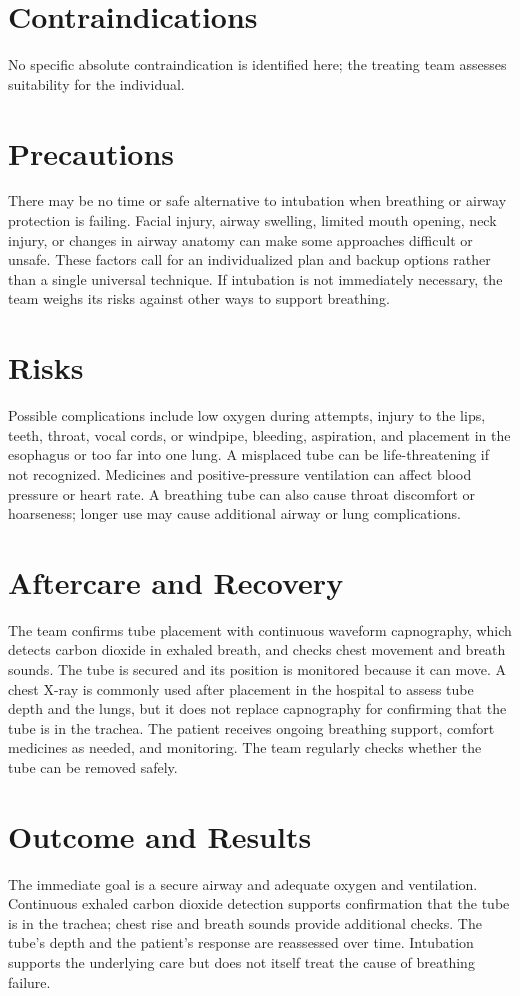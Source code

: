 \section*{Contraindications}
No specific absolute contraindication is identified here; the treating team assesses suitability for the individual.

\section*{Precautions}
There may be no time or safe alternative to intubation when breathing or airway protection is failing. Facial injury, airway swelling, limited mouth opening, neck injury, or changes in airway anatomy can make some approaches difficult or unsafe. These factors call for an individualized plan and backup options rather than a single universal technique. If intubation is not immediately necessary, the team weighs its risks against other ways to support breathing.

\section*{Risks}
Possible complications include low oxygen during attempts, injury to the lips, teeth, throat, vocal cords, or windpipe, bleeding, aspiration, and placement in the esophagus or too far into one lung. A misplaced tube can be life-threatening if not recognized. Medicines and positive-pressure ventilation can affect blood pressure or heart rate. A breathing tube can also cause throat discomfort or hoarseness; longer use may cause additional airway or lung complications.

\section*{Aftercare and Recovery}
The team confirms tube placement with continuous waveform capnography, which detects carbon dioxide in exhaled breath, and checks chest movement and breath sounds. The tube is secured and its position is monitored because it can move. A chest X-ray is commonly used after placement in the hospital to assess tube depth and the lungs, but it does not replace capnography for confirming that the tube is in the trachea. The patient receives ongoing breathing support, comfort medicines as needed, and monitoring. The team regularly checks whether the tube can be removed safely.

\section*{Outcome and Results}
The immediate goal is a secure airway and adequate oxygen and ventilation. Continuous exhaled carbon dioxide detection supports confirmation that the tube is in the trachea; chest rise and breath sounds provide additional checks. The tube's depth and the patient's response are reassessed over time. Intubation supports the underlying care but does not itself treat the cause of breathing failure.

